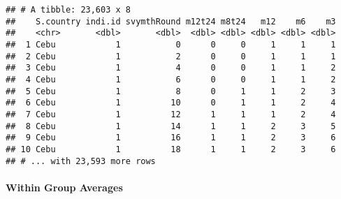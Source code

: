 \documentclass[
]{book}
\newenvironment{Shaded}{\begin{snugshade}}{\end{snugshade}}
\newcommand{\CommentTok}[1]{\textcolor[rgb]{0.56,0.35,0.01}{\textit{#1}}}
\newcommand{\DataTypeTok}[1]{\textcolor[rgb]{0.13,0.29,0.53}{#1}}
\newcommand{\DecValTok}[1]{\textcolor[rgb]{0.00,0.00,0.81}{#1}}
\newcommand{\KeywordTok}[1]{\textcolor[rgb]{0.13,0.29,0.53}{\textbf{#1}}}
\newcommand{\NormalTok}[1]{#1}
\newcommand{\OperatorTok}[1]{\textcolor[rgb]{0.81,0.36,0.00}{\textbf{#1}}}
\newcommand{\StringTok}[1]{\textcolor[rgb]{0.31,0.60,0.02}{#1}}
\begin{document}
\begin{Shaded}
\end{Shaded}

\begin{verbatim}
## # A tibble: 23,603 x 8
##    S.country indi.id svymthRound m12t24 m8t24   m12    m6    m3
##    <chr>       <dbl>       <dbl>  <dbl> <dbl> <dbl> <dbl> <dbl>
##  1 Cebu            1           0      0     0     1     1     1
##  2 Cebu            1           2      0     0     1     1     1
##  3 Cebu            1           4      0     0     1     1     2
##  4 Cebu            1           6      0     0     1     1     2
##  5 Cebu            1           8      0     1     1     2     3
##  6 Cebu            1          10      0     1     1     2     4
##  7 Cebu            1          12      1     1     1     2     4
##  8 Cebu            1          14      1     1     2     3     5
##  9 Cebu            1          16      1     1     2     3     6
## 10 Cebu            1          18      1     1     2     3     6
## # ... with 23,593 more rows
\end{verbatim}

\hypertarget{within-group-averages}{%
\paragraph{Within Group Averages}\label{within-group-averages}}
\end{document}
